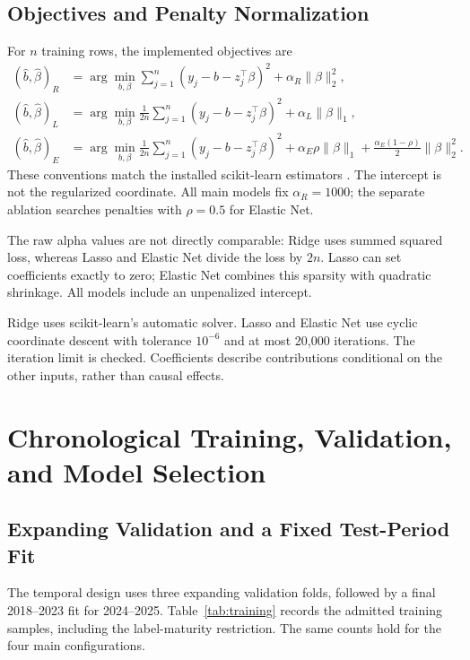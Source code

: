 \documentclass[11pt,a4paper]{article}
\newcommand{\tbl}[3]{\begin{table}[htbp]\centering\small
\caption{#2}\label{#3}#1\end{table}}
\begin{document}
\subsection{Objectives and Penalty Normalization}
For $n$ training rows, the implemented objectives are
\begin{align}
(\hat b,\hat\beta)_R
&=\arg\min_{b,\beta}
\sum_{j=1}^{n}(y_j-b-z_j^\top\beta)^2+\alpha_R\|\beta\|_2^2,
\label{eq:ridge}\\
(\hat b,\hat\beta)_L
&=\arg\min_{b,\beta}
\frac{1}{2n}\sum_{j=1}^{n}(y_j-b-z_j^\top\beta)^2+\alpha_L\|\beta\|_1,
\label{eq:lasso}\\
(\hat b,\hat\beta)_E
&=\arg\min_{b,\beta}
\frac{1}{2n}\sum_{j=1}^{n}(y_j-b-z_j^\top\beta)^2
+\alpha_E\rho\|\beta\|_1
+\frac{\alpha_E(1-\rho)}{2}\|\beta\|_2^2.
\label{eq:elastic}
\end{align}
These conventions match the installed scikit-learn estimators
\cite{sklearnridge,sklearnlasso,sklearnelastic}. The intercept is not the
regularized coordinate. All main models fix $\alpha_R=1000$; the separate
ablation searches penalties with $\rho=0.5$ for Elastic Net.

The raw alpha values are not directly comparable: Ridge uses summed squared
loss, whereas Lasso and Elastic Net divide the loss by $2n$. Lasso can set
coefficients exactly to zero; Elastic Net combines this sparsity with
quadratic shrinkage. All models include an unpenalized intercept.

Ridge uses scikit-learn's automatic solver. Lasso and Elastic Net use cyclic
coordinate descent with tolerance $10^{-6}$ and at most 20,000 iterations.
The iteration limit is checked. Coefficients describe contributions conditional
on the other inputs, rather than causal effects.

\section{Chronological Training, Validation, and Model Selection}
\label{sec:split}
\subsection{Expanding Validation and a Fixed Test-Period Fit}
The temporal design uses three expanding validation folds, followed by a
final 2018--2023 fit for 2024--2025. Table~\ref{tab:training}
records the admitted training samples, including the label-maturity
restriction. The same counts hold for the four main configurations.
\tbl{\TrainingTable}{Training windows and mature-label samples from run metadata.}
{tab:training}
\end{document}
